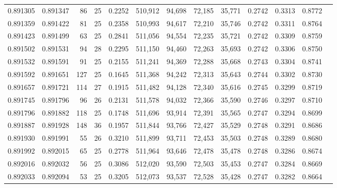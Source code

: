 \begin{tabular}{rrrrrrrrrrrrr}
0.891305 & 0.891347 &    86 &  25 &                                     0.2252 & 510,912 &  94,698 &  72,185 &  35,771 & 0.2742 & 0.3313 & 0.8772 \\
0.891359 & 0.891422 &    81 &  25 &                                     0.2358 & 510,993 &  94,617 &  72,210 &  35,746 & 0.2742 & 0.3311 & 0.8764 \\
0.891423 & 0.891499 &    63 &  25 &                                     0.2841 & 511,056 &  94,554 &  72,235 &  35,721 & 0.2742 & 0.3309 & 0.8759 \\
0.891502 & 0.891531 &    94 &  28 &                                     0.2295 & 511,150 &  94,460 &  72,263 &  35,693 & 0.2742 & 0.3306 & 0.8750 \\
0.891532 & 0.891591 &    91 &  25 &                                     0.2155 & 511,241 &  94,369 &  72,288 &  35,668 & 0.2743 & 0.3304 & 0.8741 \\
0.891592 & 0.891651 &   127 &  25 &                                     0.1645 & 511,368 &  94,242 &  72,313 &  35,643 & 0.2744 & 0.3302 & 0.8730 \\
0.891657 & 0.891721 &   114 &  27 &                                     0.1915 & 511,482 &  94,128 &  72,340 &  35,616 & 0.2745 & 0.3299 & 0.8719 \\
0.891745 & 0.891796 &    96 &  26 &                                     0.2131 & 511,578 &  94,032 &  72,366 &  35,590 & 0.2746 & 0.3297 & 0.8710 \\
0.891796 & 0.891882 &   118 &  25 &                                     0.1748 & 511,696 &  93,914 &  72,391 &  35,565 & 0.2747 & 0.3294 & 0.8699 \\
0.891887 & 0.891928 &   148 &  36 &                                     0.1957 & 511,844 &  93,766 &  72,427 &  35,529 & 0.2748 & 0.3291 & 0.8686 \\
0.891930 & 0.891991 &    55 &  26 &                                     0.3210 & 511,899 &  93,711 &  72,453 &  35,503 & 0.2748 & 0.3289 & 0.8680 \\
0.891992 & 0.892015 &    65 &  25 &                                     0.2778 & 511,964 &  93,646 &  72,478 &  35,478 & 0.2748 & 0.3286 & 0.8674 \\
0.892016 & 0.892032 &    56 &  25 &                                     0.3086 & 512,020 &  93,590 &  72,503 &  35,453 & 0.2747 & 0.3284 & 0.8669 \\
0.892033 & 0.892094 &    53 &  25 &                                     0.3205 & 512,073 &  93,537 &  72,528 &  35,428 & 0.2747 & 0.3282 & 0.8664 \\

\end{tabular}
